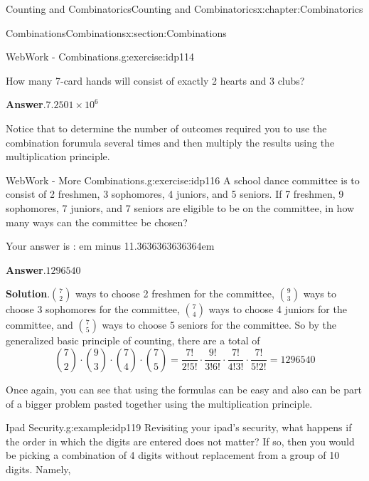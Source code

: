 \documentclass[oneside,10pt,]{book}
\newcommand{\blocktitlefont}{\relax}
\newcommand{\fillin}[1]{\leavevmode\leaders\vrule height -1.2pt depth 1.5pt \hskip #1em minus #1em \null}
\numberwithin{equation}{section}
\begin{document}
\begin{chapterptx}{Counting and Combinatorics}{}{Counting and Combinatorics}{}{}{x:chapter:Combinatorics}
\begin{sectionptx}{Combinations}{}{Combinations}{}{}{x:section:Combinations}
\begin{inlineexercise}{WebWork - Combinations.}{g:exercise:idp114}
\par
How many 7-card hands will consist of exactly 2 hearts and 3 clubs?%
\par\smallskip%
\noindent\textbf{\blocktitlefont Answer}.\hypertarget{g:answer:idp115}{}\quad{}\(7.2501\times 10^{6}\)%
\par\medskip\noindent Notice that to determine the number of outcomes required you to use the combination forumula several times and then multiply the results using the multiplication principle.%
\par
\end{inlineexercise}%
\begin{inlineexercise}{WebWork - More Combinations.}{g:exercise:idp116}%
A school dance committee is to consist of 2 freshmen, 3 sophomores, 4 juniors, and 5 seniors. If 7 freshmen, 9 sophomores, 7 juniors, and 7 seniors are eligible to be on the committee, in how many ways can the committee be chosen?%
\par
Your answer is : \fillin{11.3636363636364}%
\par\smallskip%
\noindent\textbf{\blocktitlefont Answer}.\hypertarget{g:answer:idp117}{}\quad{}\(1296540\)%
\par\smallskip%
\noindent\textbf{\blocktitlefont Solution}.\hypertarget{g:solution:idp118}{}\quad{}\({7 \choose 2}\) ways to choose 2 freshmen for the committee, \({9 \choose 3}\) ways to choose 3 sophomores for the committee, \({7 \choose 4}\) ways to choose 4 juniors for the committee, and \({7 \choose 5}\) ways to choose 5 seniors for the committee. So by the generalized basic principle of counting, there are a total of%
\begin{equation*}
{7 \choose 2} \cdot {9 \choose 3} \cdot {7 \choose 4} \cdot {7 \choose 5}
= \frac{7 !}{2!5 !} \cdot \frac{9 !}{3! 6 !} \cdot \frac{7 !}{4! 3 !} \cdot \frac{7 !}{5! 2 !} = 1296540
\end{equation*}
\par\medskip\noindent Once again, you can see that using the formulas can be easy and also can be part of a bigger problem pasted together using the multiplication principle.%
\par
\end{inlineexercise}%
\begin{example}{Ipad Security.}{g:example:idp119}%
Revisiting your ipad's security, what happens if the order in which the digits are entered does not matter? If so, then you would be picking a combination of 4 digits without replacement from a group of 10 digits. Namely,%
\begin{align*}

\end{align*}
\end{example}
\end{sectionptx}
\end{chapterptx}
\end{document}
